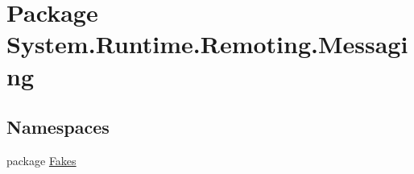 \hypertarget{namespace_system_1_1_runtime_1_1_remoting_1_1_messaging}{\section{Package System.\-Runtime.\-Remoting.\-Messaging}
\label{namespace_system_1_1_runtime_1_1_remoting_1_1_messaging}
}
\subsection*{Namespaces}
\begin{DoxyCompactItemize}
\item 
package \hyperlink{namespace_system_1_1_runtime_1_1_remoting_1_1_messaging_1_1_fakes}{Fakes}
\end{DoxyCompactItemize}
